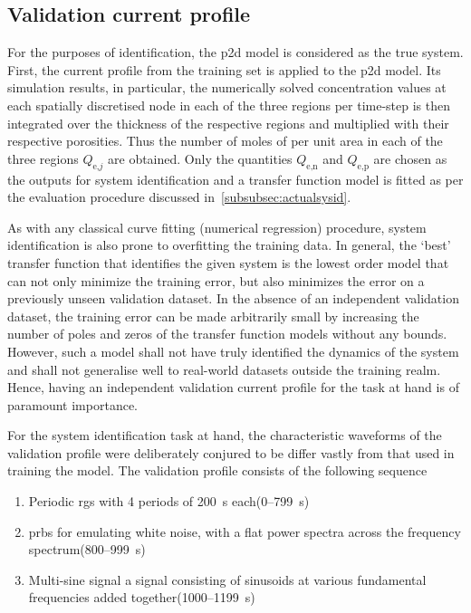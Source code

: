 \subsection{Validation current profile}
For the  purposes of identification,  the \gls{p2d}  model is considered  as the
true system. First, the current profile from  the training set is applied to the
\gls{p2d} model. Its  simulation results, in particular,  the numerically solved
concentration values  at each spatially  discretised node  in each of  the three
regions per  time-step is then integrated  over the thickness of  the respective
regions  and multiplied  with their  respective porosities.  Thus the  number of
moles of   per unit area in each of  the three regions $Q_{\text{e,}j}$
are obtained. Only  the quantities $Q_\text{e,n}$ and  $Q_\text{e,p}$ are chosen
as the outputs for system identification and a transfer function model is fitted
as per the evaluation procedure discussed in~\cref{subsubsec:actualsysid}.

As with  any classical  curve fitting  (numerical regression)  procedure, system
identification is also  prone to overfitting the training data.  In general, the
`best' transfer  function that identifies the  given system is the  lowest order
model that  can not  only minimize  the training error,  but also  minimizes the
error  on  a  previously  unseen  validation  dataset.  In  the  absence  of  an
independent validation dataset, the training error can be made arbitrarily small
by increasing  the number  of poles  and zeros of  the transfer  function models
without any  bounds. However, such a  model shall not have  truly identified the
dynamics of  the system  and shall  not generalise  well to  real-world datasets
outside  the training  realm. Hence,  having an  independent validation  current
profile for the task at hand is of paramount importance.

For the system identification task at  hand, the characteristic waveforms of the
validation profile were deliberately conjured to be differ vastly from that used
in training the model. The  validation profile consists of the following
sequence
\begin{enumerate}
    \item Periodic \gls{rgs} with 4 periods of \SI{200}{\second} each\quad (0--\SI{799}{\second})
    \item \gls{prbs} for emulating white noise, \ie{} with a flat power spectra
        across the frequency spectrum\quad (800--\SI{999}{\second})
    \item Multi-sine signal \ie{} a signal consisting of sinusoids at
        various fundamental frequencies added together\quad (1000--\SI{1199}{\second})
\end{enumerate}

